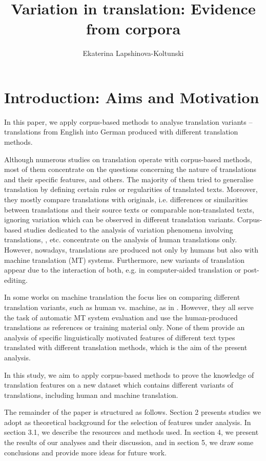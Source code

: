 \documentclass[output=paper]{LSP/langsci}
\author{Ekaterina Lapshinova-Koltunski}
\title{Variation in translation: Evidence from corpora}
\begin{document}
\section{Introduction: Aims and Motivation}

In this paper, we apply corpus-based methods to analyse translation variants – translations from English into German produced with different translation methods.

Although numerous studies on translation operate with corpus-based methods, most of them concentrate on the questions concerning the nature of translations and their speciﬁc features, \citep[see e.g.][]{Baker1993,Baker1995,Laviosa2002,Chesterman2004} and others. The majority of them tried to generalise translation by deﬁning certain rules or regularities of translated texts.  Moreover, they mostly compare translations with originals, i.e. differences or similarities between translations and their source texts or comparable non-translated texts, ignoring variation which can be observed in different translation variants. Corpus-based studies dedicated to the analysis of variation phenomena involving translations, \citep[e.g.][]{Teich2003,Steiner2004,Neumann2013}, etc. concentrate on the analysis of human translations only. However, nowadays, translations are produced not only by humans but also with machine translation (MT) systems. Furthermore, new variants of translation appear due to the interaction of both, e.g. in computer-aided translation or post-editing.

In some works on machine translation the focus lies on comparing different translation variants, such as human vs. machine, as in  \citep{White1994,Papineni2002,BabychHartley2004,Popovic2011}. However, they all serve the task of automatic MT system evaluation and use the human-produced translations as references or training material only. None of them provide an analysis of specific linguistically motivated features of different text types translated with different translation methods, which is the aim of the present analysis.

In this study, we aim to apply corpus-based methods to prove the knowledge of translation features on a new dataset which contains different variants of translations, including human and machine translation.

The remainder of the paper is structured as follows. Section 2 presents studies we adopt as theoretical background for the selection of features under analysis.  In section 3.1, we describe the resources and methods used. In section 4, we present the results of our analyses and their discussion, and in section 5, we draw some conclusions and provide more ideas for future work.
\end{document}
